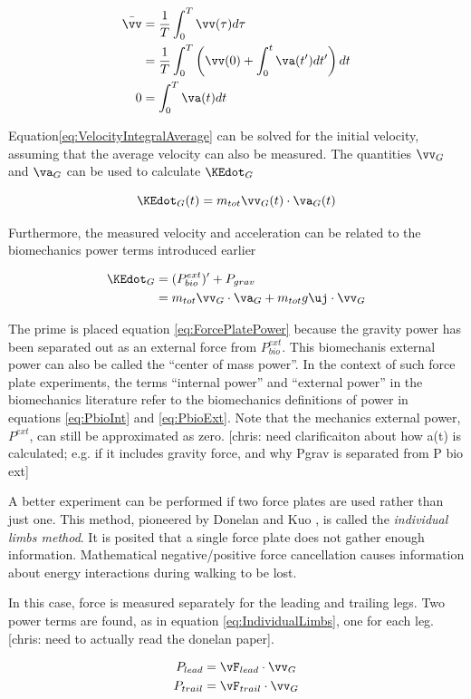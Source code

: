 \begin{align}
\bar{\vv} &= \frac{1}{T}\int_{0}^{T} \vv(\tau)d\tau \notag \\
&= \frac{1}{T} \int_0^{T} \left( \vv(0) + \int_{0}^{t} \va(t') dt' \right) dt \\
0 &= \int_{0}^{T} \va(t)dt
\label{eq:VelocityIntegralAverage}
\end{align}

Equation\ref{eq:VelocityIntegralAverage} can be solved for the initial velocity, assuming that the average velocity can also be measured. The quantities $\vv_{G}$ and $\va_{G}$ can be used to calculate $\KEdot_{G}$

\begin{equation}
\KEdot_{G}(t) = m_{tot} \vv_{G}(t) \cdot \va_{G}(t)
\end{equation}

Furthermore, the measured velocity and acceleration can be related to the biomechanics power terms introduced earlier

\begin{align}
\KEdot_{G} &= (P_{bio}^{ext})^{\prime} + P_{grav} \notag \\
&= m_{tot} \vv_{G} \cdot \va_{G} + m_{tot} g \uj \cdot \vv_{G} \label{eq:ForcePlatePower} \\
\end{align}

The prime is placed equation \ref{eq:ForcePlatePower} because the gravity power has been separated out as an external force from $P_{bio}^{ext}$. This biomechanis external power can also be called the ``center of mass power''. In the context of such force plate experiments, the terms ``internal power'' and ``external power'' in the biomechanics literature refer to the biomechanics definitions of power in equations \ref{eq:PbioInt} and \ref{eq:PbioExt}. Note that the mechanics external power, $P^{ext}$, can still be approximated as zero. [chris: need clarificaiton about how a(t) is calculated; e.g. if it includes gravity force, and why Pgrav is separated from P bio ext]

A better experiment can be performed if two force plates are used rather than just one. This method, pioneered by Donelan and Kuo \cite{donelan01}, is called the \emph{individual limbs method}. It is posited that a single force plate does not gather enough information. Mathematical negative/positive force cancellation causes information about energy interactions during walking to be lost.

In this case, force is measured separately for the leading and trailing legs. Two power terms are found, as in equation \ref{eq:IndividualLimbs}, one for each leg. [chris: need to actually read the donelan paper].

\begin{align}
P_{lead} &= \vF_{lead} \cdot \vv_{G} \\
P_{trail} &= \vF_{trail} \cdot \vv_{G}
\label{eq:IndividualLimbs}
\end{align}
